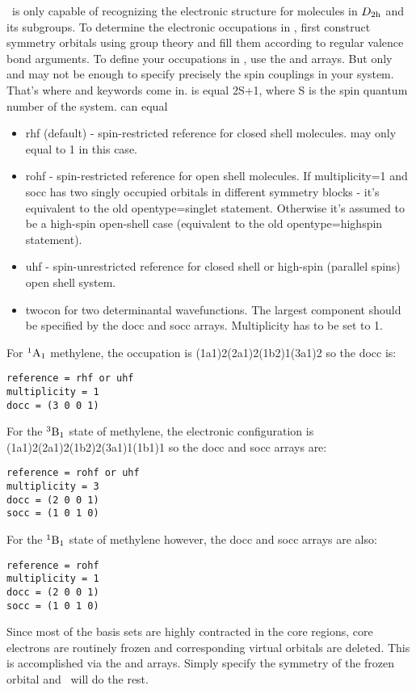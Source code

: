 \PSIthree\ is only capable of recognizing the electronic structure
for molecules in $D_{\rm 2h}$ and its subgroups. To determine the
electronic occupations in \PSIthree, first construct symmetry
orbitals using group theory and fill them according to regular
valence bond arguments. To define your occupations in \PSIthree,
use the  and  arrays. But only 
and  may not be enough to specify precisely
the spin couplings in your system. That's where  and
 keywords come in.  is equal
2S+1, where S is the spin quantum number of the system.  can equal 
\begin{itemize}
\item rhf (default) - spin-restricted reference for closed shell molecules.
 may only equal to 1 in this case.
\item rohf - spin-restricted reference for open shell molecules.
If multiplicity=1 and socc has two singly occupied orbitals in
different symmetry blocks - it's equivalent to the old opentype=singlet statement.
Otherwise it's assumed to be a high-spin open-shell case
(equivalent to the old opentype=highspin statement).
\item uhf - spin-unrestricted reference for closed shell or high-spin (parallel spins) open shell system.
\item twocon for two determinantal wavefunctions. The largest
component should be specified by the docc and socc arrays.
Multiplicity has to be set to 1.
\end{itemize}
For $^1{\rm A}_1$ methylene, the occupation is (1a1)2(2a1)2(1b2)1(3a1)2 so the docc is: 
\begin{verbatim}
reference = rhf or uhf
multiplicity = 1
docc = (3 0 0 1)
\end{verbatim}
For the $^3{\rm B}_1$ state of methylene,
the electronic configuration is (1a1)2(2a1)2(1b2)2(3a1)1(1b1)1 so the docc and socc arrays are: 
\begin{verbatim}
reference = rohf or uhf
multiplicity = 3
docc = (2 0 0 1)
socc = (1 0 1 0)
\end{verbatim}
For the $^1{\rm B}_1$ state of methylene however, the docc and socc arrays are also: 
\begin{verbatim}
reference = rohf
multiplicity = 1
docc = (2 0 0 1)
socc = (1 0 1 0)
\end{verbatim}
Since most of the basis sets are highly contracted in the core regions,
core electrons are routinely frozen and corresponding virtual
orbitals are deleted. This is accomplished via the 
and  arrays. Simply specify the symmetry of
the frozen orbital and \PSIthree\ will do the rest. 

